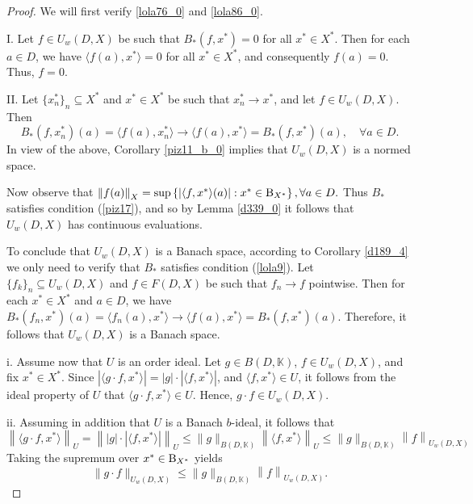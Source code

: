 \documentclass[14pt, a4paper]{article}  %
\newcounter{property}
\providecommand{\pare}[1]{\left( #1\right) }
\providecommand{\norm}[1]{\left\lVert#1\right\rVert}
\providecommand{\abs}[1]{\left\lvert#1\right\rvert}
\newcommand{\K}{\mathbb{K}}
\newcommand{\B}{\textup{B}}
\begin{document}
		\begin{proof}
			We will first  verify  \ref{lola76_0} and \ref{lola86_0}.
			
			I. Let $f \in U_{w}\pare{D,X}$ be such  that $B_{*}\pare{f,x^{*}} = 0$ for all $x^{*} \in X^{*}$. Then for each $a \in D$, we have $\langle f(a), x^{*} \rangle = 0$ for all $x^{*} \in X^{*}$, and consequently $f(a) = 0$. Thus, $f = 0$.
			
			II. Let $\{x_{n}^{*}\}_{n} \subseteq X^{*}$ and $x^{*} \in X^{*}$ be such that $x_{n}^{*} \to x^{*}$, and let $f \in U_{w}\pare{D,X}$. Then 
			\begin{equation}
				B_{*}\pare{f,x_{n}^{*}}(a) = \langle f(a), x_{n}^{*} \rangle \to \langle f(a), x^{*} \rangle = B_{*}\pare{f,x^{*}}(a), \quad \forall a \in D.
			\end{equation}
			In view of the above, Corollary \ref{piz11_b_0} implies that $U_{w}\pare{D,X}$ is a normed space.
			
			Now observe that $\norm{f(a)}_{X} = \sup \left\{ \abs{\langle f,x^{*} \rangle(a)} : x^{*} \in \B_{X^{*}} \right\},  \forall a \in D.$
			Thus $B_{*}$ satisfies condition (\ref{piz17}), and so by Lemma \ref{d339_0} it follows that $U_{w}\pare{D,X}$ has continuous evaluations.
			
			To conclude that $U_{w}\pare{D,X}$ is a Banach space, according to Corollary \ref{d189_4} we only need to verify that $B_{*}$ satisfies condition (\ref{lola9}). Let $\{f_{k}\}_{n} \subseteq U_{w}\pare{D,X}$  and $f \in F\pare{D,X}$ be such that $f_{n} \to f$ pointwise. Then for each $x^{*} \in X^{*}$ and $a \in D$, we have
			$ B_{*}\pare{f_{n},x^{*}}(a) = \langle f_{n}(a), x^{*} \rangle \to \langle f(a), x^{*} \rangle = B_{*}\pare{f,x^{*}}(a). $
			Therefore, it follows that $U_{w}\pare{D,X}$ is a Banach space.
			
			i. Assume now that $U$ is an order ideal. Let $g\in B\pare{D,\K}$, $f\in U_{w}\pare{D,X}$, and fix $x^{*}\in X^{*}$. Since
			$\abs{\langle g\cdot f,x^{*}\rangle}
			=
			\abs{g}\cdot \abs{\langle f,x^{*}\rangle}$,
			and $\langle f,x^{*}\rangle\in U$, it follows from the ideal property of $U$ that $\langle g\cdot f,x^{*}\rangle\in U$. Hence, $g\cdot f\in U_{w}\pare{D,X}$. 
			
			ii. Assuming in addition that $U$ is a Banach $b$-ideal, it follows that \begin{equation}
				\norm{\langle g \cdot f, x^{*} \rangle}_{U} = \norm{\abs{g} \cdot \abs{\langle f, x^{*} \rangle}}_{U}\leq \|g\|_{B\pare{D,\K}} \norm{ \langle f, x^{*} \rangle}_{U}\leq \|g\|_{B\pare{D,\K}} \norm{f}_{U_{w}(D,X)}
			\end{equation}  Taking the supremum over $x^{*}\in \B_{X^{*}}$ yields
			\begin{equation}
				\|g\cdot f\|_{U_{w}(D,X)}
				\leq
				\|g\|_{B\pare{D,\K}}
				\norm{f}_{U_{w}(D,X)}. 
			\end{equation} 
			

\end{proof}
\end{document}

